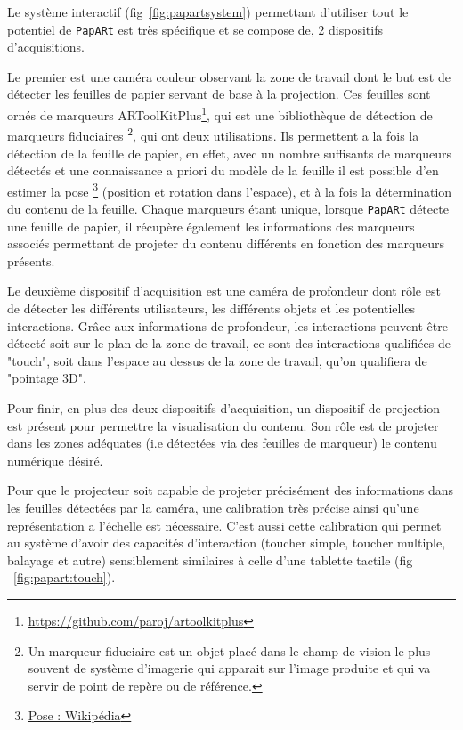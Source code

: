 Le système interactif (fig~\ref{fig:papartsystem}) permettant d'utiliser tout le potentiel de \texttt{PapARt} est très spécifique et se compose de, 2 dispositifs d'acquisitions.

Le premier est une caméra couleur observant la zone de travail dont le but est de détecter les feuilles de papier servant de base à la projection. Ces feuilles sont ornés de marqueurs ARToolKitPlus\footnote{\href{https://github.com/paroj/artoolkitplus}{https://github.com/paroj/artoolkitplus}}, qui est une bibliothèque de détection de marqueurs fiduciaires \footnote{Un marqueur fiduciaire est un objet placé dans le champ de vision le plus souvent de système d'imagerie qui apparait sur l'image produite et qui va servir de point de repère ou de référence.}, qui ont deux utilisations. Ils permettent a la fois la détection de la feuille de papier, en effet, avec un nombre suffisants de marqueurs détectés et une connaissance a priori du modèle de la feuille il est possible d'en estimer la pose \footnote{\href{https://en.wikipedia.org/wiki/Pose_(computer_vision)}{Pose : Wikipédia}} (position et rotation dans l'espace), et à la fois la détermination du contenu de la feuille. Chaque marqueurs étant unique, lorsque \texttt{PapARt} détecte une feuille de papier, il récupère également les informations des marqueurs associés permettant de projeter du contenu différents en fonction des marqueurs présents.

Le deuxième dispositif d'acquisition est une caméra de profondeur dont rôle est de détecter les différents utilisateurs, les différents objets et les potentielles interactions. Grâce aux informations de profondeur, les interactions peuvent être détecté soit sur le plan de la zone de travail, ce sont des interactions qualifiées de "touch", soit dans l'espace au dessus de la zone de travail, qu'on qualifiera de "pointage 3D".

Pour finir, en plus des deux dispositifs d'acquisition, un dispositif de projection est présent pour permettre la visualisation du contenu. Son rôle est de projeter dans les zones adéquates (i.e détectées via des feuilles de marqueur) le contenu numérique désiré.

Pour que le projecteur soit capable de projeter précisément des informations dans les feuilles détectées par la caméra, une calibration très précise ainsi qu'une représentation a l'échelle est nécessaire. C'est aussi cette calibration qui permet au système d'avoir des capacités d'interaction (toucher simple, toucher multiple, balayage et autre) sensiblement similaires à celle d'une tablette tactile (fig ~\ref{fig:papart:touch}).

